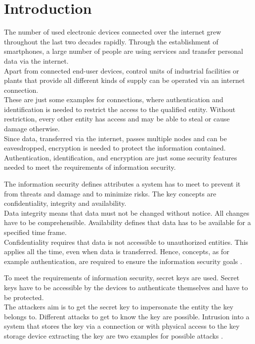 \chapter{Introduction}
\label{cap:introduction}

The number of used electronic devices connected over the internet grew throughout the last two decades rapidly.
Through the establishment of smartphones, a large number of people are using services and transfer personal data via the internet.\\
Apart from connected end-user devices, control units of industrial facilities or plants that provide all different kinds of supply can be operated via an internet connection.\\
These are just some examples for connections, where authentication and identification is needed to restrict the access to the qualified entity.
Without restriction, every other entity has access and may be able to steal or cause damage otherwise.\\
Since data, transferred via the internet, passes multiple nodes and can be eavesdropped, encryption is needed to protect the information contained.
Authentication, identification, and encryption are just some security features needed to meet the requirements of information security.

The information security defines attributes a system has to meet to prevent it from threats and damage and to minimize risks.
The key concepts are confidentiality, integrity and availability.\\
Data integrity means that data must not be changed without notice.
All changes have to be comprehensible.
Availability defines that data has to be available for a specified time frame.\\
Confidentiality requires that data is not accessible to unauthorized entities.
This applies all the time, even when data is transferred.
Hence, concepts, as for example authentication, are required to ensure the information security goals \cite{2017InformationSecurity}.

To meet the requirements of information security, secret keys are used.
Secret keys have to be accessible by the devices to authenticate themselves and have to be protected.\\
The attackers aim is to get the secret key to impersonate the entity the key belongs to.
Different attacks to get to know the key are possible.
Intrusion into a system that stores the key via a connection or with physical access to the key storage device extracting the key are two examples for possible attacks \cite{2016Attackcomputing,2017Side-channelAttack}.

